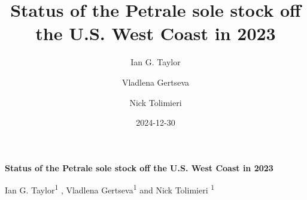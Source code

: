 \documentclass[
]{scrartcl}
\title{Status of the Petrale sole stock off the U.S. West Coast in 2023}
\author{Ian G. Taylor \and Vladlena Gertseva \and Nick Tolimieri}
\date{2024-12-30}
\begin{document}
  \begin{titlepage}

  \begin{minipage}[b][\textheight][s]{\textwidth}


  \raggedright




  {\huge\bfseries\nohyphens{Status of the Petrale sole stock off the
  U.S. West Coast in 2023}}\\[1\baselineskip]



  \vspace{1\baselineskip}


  \vspace{1\baselineskip}

   {\large{Ian G. Taylor}}{\textsuperscript{1}}%
  ,
   {\large{Vladlena Gertseva}}{\textsuperscript{1}}%
  { and \large{Nick Tolimieri}}%
  {\textsuperscript{1}}%




\end{minipage}
\end{titlepage}
\end{document}
